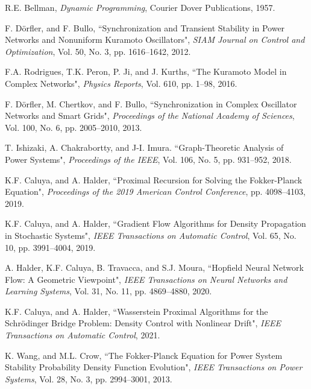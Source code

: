 \documentclass[10pt,twocolumn]{IEEEtran}
\begin{document}
\begin{thebibliography}{99}
R.E. Bellman, \emph{Dynamic Programming}, Courier Dover Publications, 1957.


F. D\"{o}rfler, and F. Bullo, ``Synchronization and Transient Stability in Power Networks and Nonuniform Kuramoto Oscillators", \emph{SIAM Journal on Control and Optimization}, Vol. 50, No. 3, pp. 1616--1642, 2012.

F.A. Rodrigues, T.K. Peron, P. Ji, and J. Kurths, ``The Kuramoto Model in Complex Networks", \emph{Physics Reports}, Vol. 610, pp. 1--98, 2016.

F. D{\"o}rfler, M. Chertkov, and F. Bullo, ``Synchronization in Complex Oscillator Networks and Smart Grids", \emph{Proceedings of the National Academy of Sciences}, Vol. 100, No. 6, pp. 2005--2010, 2013.

T. Ishizaki, A. Chakrabortty, and J-I. Imura. ``Graph-Theoretic Analysis of Power Systems", \emph{Proceedings of the IEEE}, Vol. 106, No. 5, pp. 931--952, 2018.


K.F. Caluya, and A. Halder, ``Proximal Recursion for Solving the Fokker-Planck Equation", \emph{Proceedings of the 2019 American Control Conference}, pp. 4098--4103, 2019.

K.F. Caluya, and A. Halder, ``Gradient Flow Algorithms for Density Propagation in Stochastic Systems", \emph{IEEE Transactions on Automatic Control}, Vol. 65, No. 10, pp. 3991--4004, 2019.

A. Halder, K.F. Caluya, B. Travacca, and S.J. Moura, ``Hopfield Neural Network Flow: A Geometric Viewpoint", \emph{IEEE Transactions on Neural Networks and Learning Systems}, Vol. 31, No. 11, pp. 4869--4880, 2020. 


K.F. Caluya, and A. Halder, ``Wasserstein Proximal Algorithms for the Schr\"{o}dinger Bridge Problem: Density Control with Nonlinear Drift", \emph{IEEE Transactions on Automatic Control}, 2021.


K. Wang, and M.L. Crow, ``The Fokker-Planck Equation for Power System Stability Probability Density Function Evolution", \emph{IEEE Transactions on Power Systems}, Vol. 28, No. 3, pp. 2994--3001, 2013.


\end{thebibliography}
\end{document}
